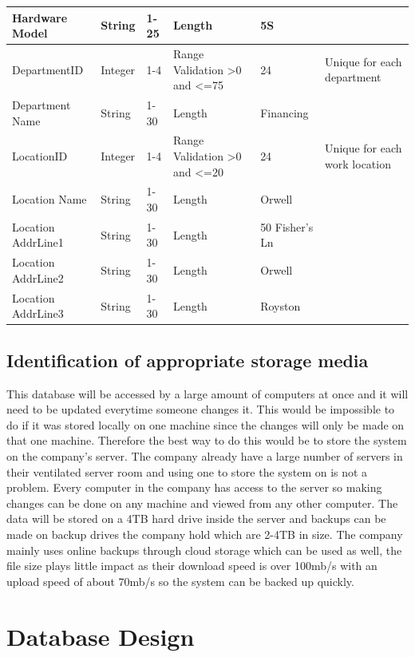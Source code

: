 \begin{center}
\begin{longtable}{|p{2cm}|p{1.14cm}|p{1.1cm}|p{1.7cm}|p{1.7cm}|p{2cm}|}
Hardware Model                       & String                                  & 1-25                                 & Length                                   & 5S                    &                       \\ \hline
DepartmentID &Integer				& 1-4				&Range Validation \textgreater0 and \textless=75		& 24		& Unique for each department	\\ \hline
Department Name & String				& 1-30				& Length		& Financing		&	\\ \hline
LocationID &Integer				& 1-4				&Range Validation \textgreater0 and \textless=20		& 	24	& Unique for each work location		\\ \hline
Location Name & String				& 1-30				& Length		&	Orwell	 &  \\ \hline
Location AddrLine1 & String				& 1-30				& Length		&	50 Fisher's Ln	 &  \\ \hline
Location AddrLine2 & String				& 1-30				& Length		&	Orwell	 &  \\ \hline
Location AddrLine3  & String				& 1-30				& Length		&	Royston 	 &  \\ \hline
\end{longtable}
\end{center}

\newpage
\subsection{Identification of appropriate storage media}

This database will be accessed by a large amount of computers at once and it will need to be updated everytime someone changes it. This would be impossible to do if it was stored locally on one machine since the changes will only be made on that one machine. Therefore the best way to do this would be to store the system on the company's server. The company already have a large number of servers in their ventilated server room and using one to store the system on is not a problem. Every computer in the company has access to the server so making changes can be done on any machine and viewed from any other computer. The data will be stored on a 4TB hard drive inside the server and backups can be made on backup drives the company hold which are 2-4TB in size. The company mainly uses online backups through cloud storage which can be used as well, the file size plays little impact as their download speed is over 100mb/s with an upload speed of about 70mb/s so the system can be backed up quickly.
\section{Database Design}

